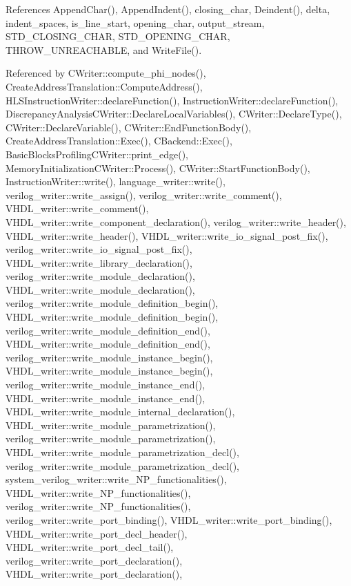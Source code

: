 References Append\+Char(), Append\+Indent(), closing\+\_\+char, Deindent(), delta, indent\+\_\+spaces, is\+\_\+line\+\_\+start, opening\+\_\+char, output\+\_\+stream, S\+T\+D\+\_\+\+C\+L\+O\+S\+I\+N\+G\+\_\+\+C\+H\+AR, S\+T\+D\+\_\+\+O\+P\+E\+N\+I\+N\+G\+\_\+\+C\+H\+AR, T\+H\+R\+O\+W\+\_\+\+U\+N\+R\+E\+A\+C\+H\+A\+B\+LE, and Write\+File().



Referenced by C\+Writer\+::compute\+\_\+phi\+\_\+nodes(), Create\+Address\+Translation\+::\+Compute\+Address(), H\+L\+S\+Instruction\+Writer\+::declare\+Function(), Instruction\+Writer\+::declare\+Function(), Discrepancy\+Analysis\+C\+Writer\+::\+Declare\+Local\+Variables(), C\+Writer\+::\+Declare\+Type(), C\+Writer\+::\+Declare\+Variable(), C\+Writer\+::\+End\+Function\+Body(), Create\+Address\+Translation\+::\+Exec(), C\+Backend\+::\+Exec(), Basic\+Blocks\+Profiling\+C\+Writer\+::print\+\_\+edge(), Memory\+Initialization\+C\+Writer\+::\+Process(), C\+Writer\+::\+Start\+Function\+Body(), Instruction\+Writer\+::write(), language\+\_\+writer\+::write(), verilog\+\_\+writer\+::write\+\_\+assign(), verilog\+\_\+writer\+::write\+\_\+comment(), V\+H\+D\+L\+\_\+writer\+::write\+\_\+comment(), V\+H\+D\+L\+\_\+writer\+::write\+\_\+component\+\_\+declaration(), verilog\+\_\+writer\+::write\+\_\+header(), V\+H\+D\+L\+\_\+writer\+::write\+\_\+header(), V\+H\+D\+L\+\_\+writer\+::write\+\_\+io\+\_\+signal\+\_\+post\+\_\+fix(), verilog\+\_\+writer\+::write\+\_\+io\+\_\+signal\+\_\+post\+\_\+fix(), V\+H\+D\+L\+\_\+writer\+::write\+\_\+library\+\_\+declaration(), verilog\+\_\+writer\+::write\+\_\+module\+\_\+declaration(), V\+H\+D\+L\+\_\+writer\+::write\+\_\+module\+\_\+declaration(), verilog\+\_\+writer\+::write\+\_\+module\+\_\+definition\+\_\+begin(), V\+H\+D\+L\+\_\+writer\+::write\+\_\+module\+\_\+definition\+\_\+begin(), verilog\+\_\+writer\+::write\+\_\+module\+\_\+definition\+\_\+end(), V\+H\+D\+L\+\_\+writer\+::write\+\_\+module\+\_\+definition\+\_\+end(), verilog\+\_\+writer\+::write\+\_\+module\+\_\+instance\+\_\+begin(), V\+H\+D\+L\+\_\+writer\+::write\+\_\+module\+\_\+instance\+\_\+begin(), verilog\+\_\+writer\+::write\+\_\+module\+\_\+instance\+\_\+end(), V\+H\+D\+L\+\_\+writer\+::write\+\_\+module\+\_\+instance\+\_\+end(), V\+H\+D\+L\+\_\+writer\+::write\+\_\+module\+\_\+internal\+\_\+declaration(), V\+H\+D\+L\+\_\+writer\+::write\+\_\+module\+\_\+parametrization(), verilog\+\_\+writer\+::write\+\_\+module\+\_\+parametrization(), V\+H\+D\+L\+\_\+writer\+::write\+\_\+module\+\_\+parametrization\+\_\+decl(), verilog\+\_\+writer\+::write\+\_\+module\+\_\+parametrization\+\_\+decl(), system\+\_\+verilog\+\_\+writer\+::write\+\_\+\+N\+P\+\_\+functionalities(), V\+H\+D\+L\+\_\+writer\+::write\+\_\+\+N\+P\+\_\+functionalities(), verilog\+\_\+writer\+::write\+\_\+\+N\+P\+\_\+functionalities(), verilog\+\_\+writer\+::write\+\_\+port\+\_\+binding(), V\+H\+D\+L\+\_\+writer\+::write\+\_\+port\+\_\+binding(), V\+H\+D\+L\+\_\+writer\+::write\+\_\+port\+\_\+decl\+\_\+header(), V\+H\+D\+L\+\_\+writer\+::write\+\_\+port\+\_\+decl\+\_\+tail(), verilog\+\_\+writer\+::write\+\_\+port\+\_\+declaration(), V\+H\+D\+L\+\_\+writer\+::write\+\_\+port\+\_\+declaration(), 